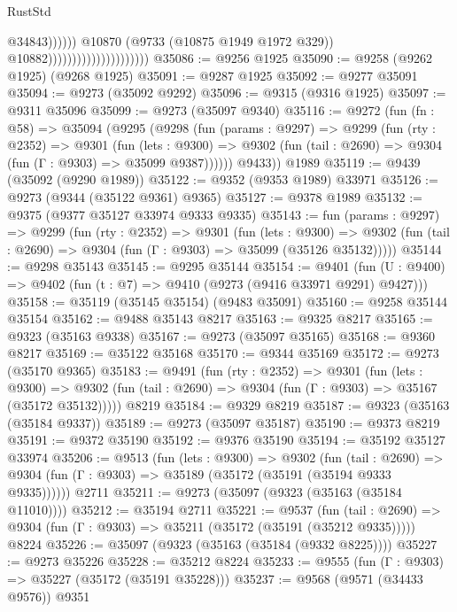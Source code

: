 \begin{lexlean}{RustStd}
\begin{coremodule}
{\begin{coremodule}
{{{{{{{{{{{{{{{{{{{{{{{{{{{{{{{{{{{{{{{{{{{{{{{{{{{{{{{                                                          @34843))))))
                                              @10870
                                              (@9733 (@10875 @1949 @1972 @329))
                                              @10882)))))))))))))))))))))
@35086 := @9256 @1925
@35090 := @9258 (@9262 @1925) (@9268 @1925)
@35091 := @9287 @1925
@35092 := @9277 @35091
@35094 := @9273 (@35092 @9292)
@35096 := @9315 (@9316 @1925)
@35097 := @9311 @35096
@35099 := @9273 (@35097 @9340)
@35116 := @9272
    (fun (fn : @58) =>
    @35094
      (@9295
        (@9298
          (fun (params : @9297) =>
          @9299
            (fun (rty : @2352) =>
            @9301
              (fun (lets : @9300) =>
              @9302 (fun (tail : @2690) => @9304 (fun (Γ : @9303) => @35099 @9387))))))
        @9433))
    @1989
@35119 := @9439 (@35092 (@9290 @1989))
@35122 := @9352 (@9353 @1989) @33971
@35126 := @9273 (@9344 (@35122 @9361) @9365)
@35127 := @9378 @1989
@35132 := @9375 (@9377 @35127 @33974 @9333 @9335)
@35143 := fun (params : @9297) =>
  @9299
    (fun (rty : @2352) =>
    @9301
      (fun (lets : @9300) =>
      @9302 (fun (tail : @2690) => @9304 (fun (Γ : @9303) => @35099 (@35126 @35132)))))
@35144 := @9298 @35143
@35145 := @9295 @35144
@35154 := @9401
    (fun (U : @9400) => @9402 (fun (t : @7) => @9410 (@9273 (@9416 @33971 @9291) @9427)))
@35158 := @35119 (@35145 @35154) (@9483 @35091)
@35160 := @9258 @35144 @35154
@35162 := @9488 @35143 @8217
@35163 := @9325 @8217
@35165 := @9323 (@35163 @9338)
@35167 := @9273 (@35097 @35165)
@35168 := @9360 @8217
@35169 := @35122 @35168
@35170 := @9344 @35169
@35172 := @9273 (@35170 @9365)
@35183 := @9491
    (fun (rty : @2352) =>
    @9301
      (fun (lets : @9300) =>
      @9302 (fun (tail : @2690) => @9304 (fun (Γ : @9303) => @35167 (@35172 @35132)))))
    @8219
@35184 := @9329 @8219
@35187 := @9323 (@35163 (@35184 @9337))
@35189 := @9273 (@35097 @35187)
@35190 := @9373 @8219
@35191 := @9372 @35190
@35192 := @9376 @35190
@35194 := @35192 @35127 @33974
@35206 := @9513
    (fun (lets : @9300) =>
    @9302
      (fun (tail : @2690) =>
      @9304 (fun (Γ : @9303) => @35189 (@35172 (@35191 (@35194 @9333 @9335))))))
    @2711
@35211 := @9273 (@35097 (@9323 (@35163 (@35184 @11010))))
@35212 := @35194 @2711
@35221 := @9537
    (fun (tail : @2690) => @9304 (fun (Γ : @9303) => @35211 (@35172 (@35191 (@35212 @9335)))))
    @8224
@35226 := @35097 (@9323 (@35163 (@35184 (@9332 @8225))))
@35227 := @9273 @35226
@35228 := @35212 @8224
@35233 := @9555 (fun (Γ : @9303) => @35227 (@35172 (@35191 @35228)))
@35237 := @9568 (@9571 (@34433 @9576)) @9351
}}}}}}}}}}}}}}}}}}}}}}}}}}}}}}}}}}}}}}}}}}}}}}}}}}}}}}}
\end{coremodule}}
\end{coremodule}
\end{lexlean}

